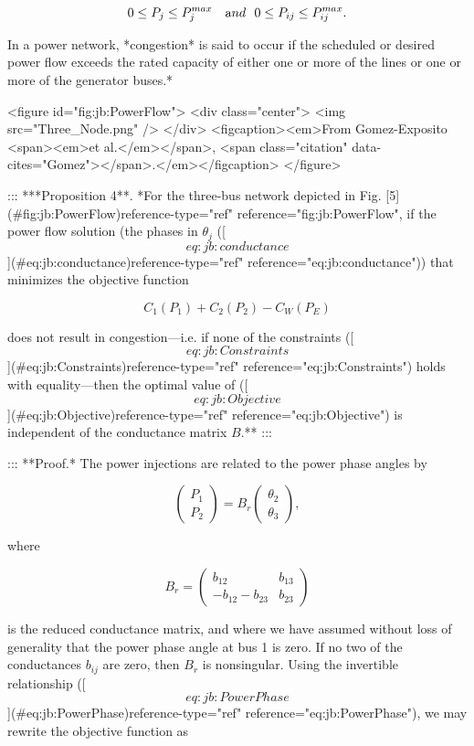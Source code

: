 $$0\le P_j\le P_j^{max} \ \ \ {\textrm and}\ \ 0\le P_{ij}\le P_{ij}^{max}. \label{eq:jb:Constraints}$$

In a power network, *congestion* is said to occur if the scheduled or desired power flow exceeds the rated capacity of either one or more of the lines or one or more of the generator buses.*

<figure id="fig:jb:PowerFlow"> <div class="center"> <img src="Three_Node.png" /> </div> <figcaption><em>From Gomez-Exposito <span><em>et al.</em></span>, <span class="citation" data-cites="Gomez"></span>.</em></figcaption> </figure>

::: ***Proposition 4**. *For the three-bus network depicted in Fig. [5](#fig:jb:PowerFlow){reference-type="ref" reference="fig:jb:PowerFlow"}, if the power flow solution (the phases in $\theta_j$ ([\[eq:jb:conductance\]](#eq:jb:conductance){reference-type="ref" reference="eq:jb:conductance"})) that minimizes the objective function

$$C_1(P_1)+C_2(P_2)-C_W(P_E) \label{eq:jb:Objective}$$

does not result in congestion---i.e. if none of the constraints ([\[eq:jb:Constraints\]](#eq:jb:Constraints){reference-type="ref" reference="eq:jb:Constraints"}) holds with equality---then the optimal value of ([\[eq:jb:Objective\]](#eq:jb:Objective){reference-type="ref" reference="eq:jb:Objective"}) is independent of the conductance matrix $B$.** :::

::: **Proof.* The power injections are related to the power phase angles by

$$\left(\begin{array}{c} P_1\\ P_2\end{array} \right) = B_r \left( \begin{array}{c} \theta_2 \\ \theta_3 \end{array} \right), \label{eq:jb:PowerPhase}$$

where

$$B_r = \left( \begin{array}{cc} b_{12}  &b_{13} \\ -b_{12} - b_{23} & b_{23} \end{array} \right)$$

is the reduced conductance matrix, and where we have assumed without loss of generality that the power phase angle at bus 1 is zero. If no two of the conductances $b_{ij}$ are zero, then $B_r$ is nonsingular. Using the invertible relationship ([\[eq:jb:PowerPhase\]](#eq:jb:PowerPhase){reference-type="ref" reference="eq:jb:PowerPhase"}), we may rewrite the objective function as

